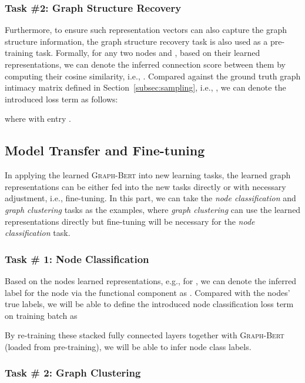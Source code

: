 \documentclass{article}
\newcommand{\our}{\textsc{Graph-Bert}}
\begin{document}
\subsubsection{Task \#2: Graph Structure Recovery}

Furthermore, to ensure such representation vectors can also capture the graph structure information, the graph structure recovery task is also used as a pre-training task. Formally, for any two nodes  and , based on their learned representations, we can denote the inferred connection score between them by computing their cosine similarity, i.e., . Compared against the ground truth graph intimacy matrix defined in Section~\ref{subsec:sampling}, i.e., , we can denote the introduced loss term as follows:

where  with entry .


\subsection{Model Transfer and Fine-tuning}

In applying the learned {\our} into new learning tasks, the learned graph representations can be either fed into the new tasks directly or with necessary adjustment, i.e., fine-tuning. In this part, we can take the \textit{node classification} and \textit{graph clustering} tasks as the examples, where \textit{graph clustering} can use the learned representations directly but fine-tuning will be necessary for the \textit{node classification} task.

\subsubsection{Task \# 1: Node Classification}\label{subsec:node_classification}

Based on the nodes learned representations, e.g.,  for , we can denote the inferred label for the node via the functional component as . Compared with the nodes' true labels, we will be able to define the introduced node classification loss term on training batch  as

By re-training these stacked fully connected layers together with {\our} (loaded from pre-training), we will be able to infer node class labels.

\subsubsection{Task \# 2: Graph Clustering}\label{subsec:graph_clustering}
\end{document}
